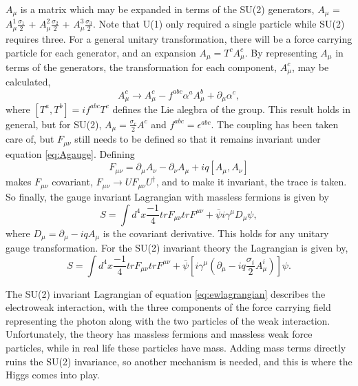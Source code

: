 $A_\mu$ is a matrix which may be expanded in terms of the SU(2) generators, $A_\mu$ = $A^1_{\mu}\frac{\sigma_1}{2}$ + $A^2_{\mu}\frac{\sigma_2}{2}$ + $A^3_{\mu}\frac{\sigma_3}{2}$. Note that U(1) only required a single particle while SU(2) requires three. For a general unitary transformation, there will be a force carrying particle for each generator, and an expansion $A_\mu = T^cA^c_\mu$. By representing $A_\mu$ in terms of the generators, the transformation for each component, $A^c_\mu$, may be calculated, 
\begin{equation}
\label{eq:Agauge}
A^c_\mu \rightarrow A^c_\mu - f^{abc}\alpha^a A^b_\mu + \partial_\mu\alpha^c, 
\end{equation}
where $[T^a,T^b]=if^{abc}T^c$ defines the Lie alegbra of the group. This result holds in general, but for SU(2), $A_\mu = \frac{\sigma_c}{2}A^c$ and $f^{abc} = \epsilon^{abc}$.
The coupling has been taken care of, but $F_{\mu\nu}$ still needs to be defined so that it remains invariant under equation \ref{eq:Agauge}. Defining 
\begin{equation}
F_{\mu\nu} = \partial_\mu A_\nu - \partial_\nu A_\mu + iq[A_\mu,A_\nu] 
\end{equation}
makes $F_{\mu\nu}$ covariant, $F_{\mu\nu} \rightarrow UF_{\mu\nu}U^\dagger$, and to make it invariant, the trace is taken. So finally, the gauge invariant Lagrangian with massless fermions is given by
\begin{equation}
S = \int d^4x \frac{-1}{4}trF_{\mu\nu}trF^{\mu\nu} + \bar{\psi}i\gamma^\mu D_\mu\psi, 
\end{equation}
where $D_\mu = \partial_\mu - iqA_\mu$ is the covariant derivative. This holds for any unitary gauge transformation. For the SU(2) invariant theory the Lagrangian is given by, 
\begin{equation}
\label{eq:ewlagrangian}
S = \int d^4x \frac{-1}{4}trF_{\mu\nu}trF^{\mu\nu} + \bar{\psi}\left[i\gamma^\mu\left(\partial_\mu - iq\frac{\sigma_i}{2}A^i_\mu\right)\right]\psi. 
\end{equation}

The SU(2) invariant Lagrangian of equation \ref{eq:ewlagrangian} describes the electroweak interaction, with the three components of the force carrying field representing the photon along with the two particles of the weak interaction. Unfortunately, the theory has massless fermions and massless weak force particles, while in real life these particles have mass. Adding mass terms directly ruins the SU(2) invariance, so another mechanism is needed, and this is where the Higgs comes into play.  

